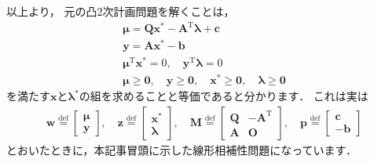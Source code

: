 \documentclass[a4paper]{jsarticle}
\begin{document}
以上より，
元の凸2次計画問題を解くことは，
\begin{align*}
\boldsymbol{\mu}=\boldsymbol{Q}\boldsymbol{x}^{*}-\boldsymbol{A}^{\mathrm{T}}\boldsymbol{\lambda}+\boldsymbol{c} \\
\boldsymbol{y}=\boldsymbol{A}\boldsymbol{x}^{*}-\boldsymbol{b} \\
\boldsymbol{\mu}^{\mathrm{T}}\boldsymbol{x}^{*}=0, \quad
\boldsymbol{y}^{\mathrm{T}}\boldsymbol{\lambda}=0 \\
\boldsymbol{\mu}\geq\boldsymbol{0}, \quad
\boldsymbol{y}\geq\boldsymbol{0}, \quad
\boldsymbol{x}^{*}\geq\boldsymbol{0}, \quad
\boldsymbol{\lambda}\geq\boldsymbol{0}
\end{align*}
を満たす$\boldsymbol{x}$と$\boldsymbol{\lambda}^{*}$の組を求めることと等価であると分かります．
これは実は
\begin{align*}
\boldsymbol{w}\overset{\mathrm{def}}{=}\begin{bmatrix}
\boldsymbol{\mu} \\ \boldsymbol{y}
\end{bmatrix}, \quad
\boldsymbol{z}\overset{\mathrm{def}}{=}\begin{bmatrix}
\boldsymbol{x}^{*} \\ \boldsymbol{\lambda}
\end{bmatrix}, \quad
\boldsymbol{M}\overset{\mathrm{def}}{=}\begin{bmatrix}
\boldsymbol{Q} & -\boldsymbol{A}^{\mathrm{T}} \\
\boldsymbol{A} & \boldsymbol{O}
\end{bmatrix}, \quad
\boldsymbol{p}\overset{\mathrm{def}}{=}\begin{bmatrix}
\boldsymbol{c} \\ -\boldsymbol{b}
\end{bmatrix}
\end{align*}
とおいたときに，本記事冒頭に示した線形相補性問題になっています．
\end{document}
